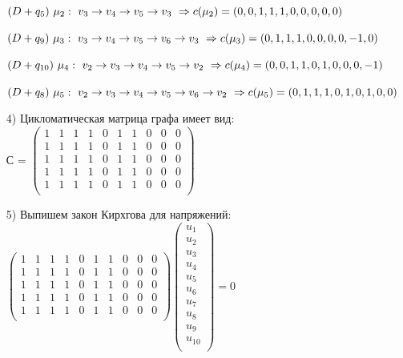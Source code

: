 \begin{enumerate}
	$(D+q_5) \ \mu_2:\ v_3 \to v_4 \to v_5 \to v_3 \ \Rightarrow \ \\ c(\mu_2) = (0,0,1,1,1,0,0,0,0,0)$
	
	$(D+q_9) \ \mu_3:\ v_3 \to v_4 \to v_5 \to v_6 \to v_3 \ \Rightarrow \ \\ c(\mu_3) = (0,1,1,1,0,0,0,0,-1,0)$
	
	$(D+q_{10}) \ \mu_4:\ v_2 \to v_3 \to v_4 \to v_5 \to v_2 \ \Rightarrow \ \\ c(\mu_4) = (0,0,1,1,0,1,0,0,0,-1)$
	
	$(D+q_{8}) \ \mu_5:\ v_2 \to v_3 \to v_4 \to v_5 \to v_6 \to v_2 \ \Rightarrow \ \\ c(\mu_5) = (0,1,1,1,0,1,0,1,0,0)$
	\item[4)] Цикломатическая матрица графа имеет вид: \\
    С = $\begin{pmatrix}
1 & 1 & 1 & 1 & 0 & 1 & 1 & 0 & 0 & 0\\
1 & 1 & 1 & 1 & 0 & 1 & 1 & 0 & 0 & 0\\
1 & 1 & 1 & 1 & 0 & 1 & 1 & 0 & 0 & 0\\
1 & 1 & 1 & 1 & 0 & 1 & 1 & 0 & 0 & 0\\
1 & 1 & 1 & 1 & 0 & 1 & 1 & 0 & 0 & 0\\
\end{pmatrix}$
    \newpage
    \item[5)] Выпишем закон Кирхгова для напряжений:\\
    $\begin{pmatrix}
1 & 1 & 1 & 1 & 0 & 1 & 1 & 0 & 0 & 0\\
1 & 1 & 1 & 1 & 0 & 1 & 1 & 0 & 0 & 0\\
1 & 1 & 1 & 1 & 0 & 1 & 1 & 0 & 0 & 0\\
1 & 1 & 1 & 1 & 0 & 1 & 1 & 0 & 0 & 0\\
1 & 1 & 1 & 1 & 0 & 1 & 1 & 0 & 0 & 0\\
\end{pmatrix}\begin{pmatrix}
u_1\\
u_2\\
u_3\\
u_4\\
u_5\\
u_6\\
u_7\\
u_8\\
u_9\\
u_{10}\\
\end{pmatrix} = 0$ \\

\end{enumerate}
